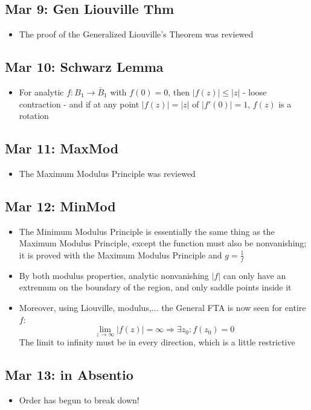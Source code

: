 \documentclass[10pt, oneside]{article}
\newcommand{\lti}[1]{\lim_{#1 \rightarrow \infty}}
\let\leq\leqslant
\begin{document}
\subsection{Mar 9: Gen Liouville Thm}
\begin{itemize}
    \item The proof of the Generalized Liouville's Theorem was reviewed
\end{itemize}

\subsection{Mar 10: Schwarz Lemma}
\begin{itemize}
    \item For analytic $f: B_1 \rightarrow \bar{B}_1$ with $f(0) = 0$, then $|f(z)| \leq |z|$ - loose contraction - and if at any point $|f(z)| = |z|$ of $|f'(0)| = 1$, $f(z)$ is a rotation
\end{itemize}

\subsection{Mar 11: MaxMod}
\begin{itemize}
    \item The Maximum Modulus Principle was reviewed
\end{itemize}

\subsection{Mar 12: MinMod}
\begin{itemize}
    \item The Minimum Modulus Principle is essentially the same thing as the Maximum Modulus Principle, except the function must also be nonvanishing; it is proved with the Maximum Modulus Principle and $g = \frac{1}{f}$
    \item By both modulus properties, analytic nonvanishing $|f|$ can only have an extremum on the boundary of the region, and only saddle points inside it
    \item Moreover, using Liouville, modulus,$\hdots$ the General FTA is now seen for entire $f$:
        \[\lti{z} |f(z)| = \infty \Rightarrow \exists z_0 : f(z_0) = 0\]
        The limit to infinity must be in every direction, which is a little restrictive
\end{itemize}

\subsection{Mar 13: in Absentio}
\begin{itemize}
    \item Order has begun to break down!
\end{itemize}
\end{document}
